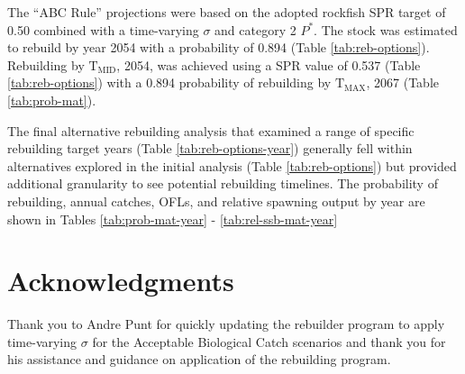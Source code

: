 \documentclass[11pt,
  english,
  a4paper,
]{article}
\begin{document}
\leavevmode\tagmcend\tagstructend\par


The ``ABC Rule'' projections were based on the adopted rockfish SPR target of 0.50 combined with a time-varying {\(\sigma\)\leavevmode\tagmcend\tagstructend} and category 2 {\(P^*\)\leavevmode\tagmcend\tagstructend}. The stock was estimated to rebuild by year 2054 with a probability of 0.894 (Table \ref{tab:reb-options}). Rebuilding by {\(\text{T}_\text{MID}\)\leavevmode\tagmcend\tagstructend}, 2054, was achieved using a SPR value of 0.537 (Table \ref{tab:reb-options}) with a 0.894 probability of rebuilding by {\(\text{T}_\text{MAX}\)\leavevmode\tagmcend\tagstructend}, 2067 (Table \ref{tab:prob-mat}).

\leavevmode\tagmcend\tagstructend\par


The final alternative rebuilding analysis that examined a range of specific rebuilding target years (Table \ref{tab:reb-options-year}) generally fell within alternatives explored in the initial analysis (Table \ref{tab:reb-options}) but provided additional granularity to see potential rebuilding timelines. The probability of rebuilding, annual catches, OFLs, and relative spawning output by year are shown in Tables \ref{tab:prob-mat-year} - \ref{tab:rel-ssb-mat-year}

\leavevmode\tagmcend\tagstructend\par


\hypertarget{acknowledgments}{%
\section{Acknowledgments}\label{acknowledgments}}

\leavevmode\tagmcend\tagstructend


Thank you to Andre Punt for quickly updating the rebuilder program to apply time-varying {\(\sigma\)\leavevmode\tagmcend\tagstructend} for the Acceptable Biological Catch scenarios and thank you for his assistance and guidance on application of the rebuilding program.
\end{document}
